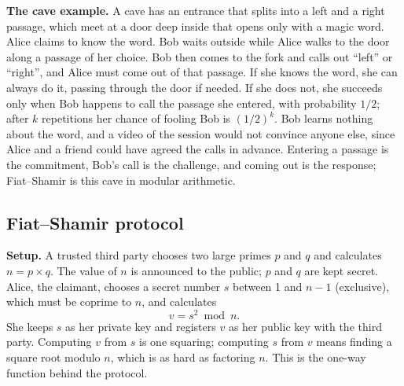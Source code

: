 \textbf{The cave example.} A cave has an entrance that splits into a left and a right passage, which meet at a door deep inside that opens only with a magic word. Alice claims to know the word. Bob waits outside while Alice walks to the door along a passage of her choice. Bob then comes to the fork and calls out ``left'' or ``right'', and Alice must come out of that passage. If she knows the word, she can always do it, passing through the door if needed. If she does not, she succeeds only when Bob happens to call the passage she entered, with probability $1/2$; after $k$ repetitions her chance of fooling Bob is $(1/2)^k$. Bob learns nothing about the word, and a video of the session would not convince anyone else, since Alice and a friend could have agreed the calls in advance. Entering a passage is the commitment, Bob's call is the challenge, and coming out is the response; Fiat--Shamir is this cave in modular arithmetic.

\subsection{Fiat--Shamir protocol \hot}

\textbf{Setup.} A trusted third party chooses two large primes $p$ and $q$ and calculates $n = p \times q$. The value of $n$ is announced to the public; $p$ and $q$ are kept secret. Alice, the claimant, chooses a secret number $s$ between 1 and $n - 1$ (exclusive), which must be coprime to $n$, and calculates
\[
v = s^2 \bmod n .
\]
She keeps $s$ as her private key and registers $v$ as her public key with the third party. Computing $v$ from $s$ is one squaring; computing $s$ from $v$ means finding a square root modulo $n$, which is as hard as factoring $n$. This is the one-way function behind the protocol.

